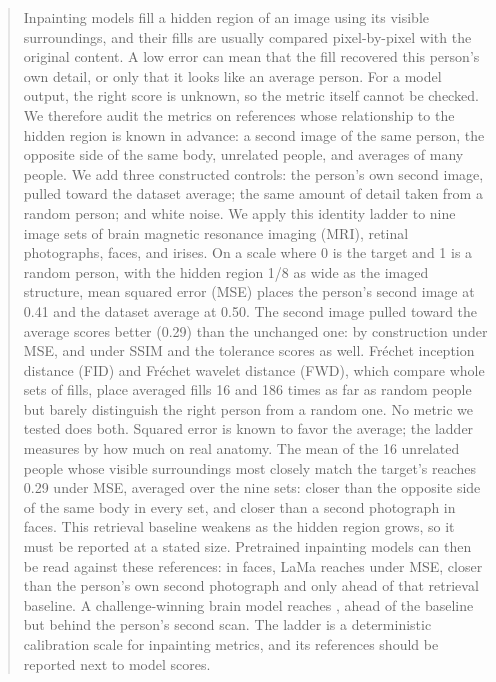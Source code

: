 \begin{abstract}
Inpainting models fill a hidden region of an image using its visible surroundings, and their fills are usually compared pixel-by-pixel with the original content.
A low error can mean that the fill recovered this person's own detail, or only that it looks like an average person.
For a model output, the right score is unknown, so the metric itself cannot be checked.
We therefore audit the metrics on references whose relationship to the hidden region is known in advance: a second image of the same person, the opposite side of the same body, unrelated people, and averages of many people.
We add three constructed controls: the person's own second image, pulled toward the dataset average; the same amount of detail taken from a random person; and white noise.
We apply this identity ladder to nine image sets of brain magnetic resonance imaging (MRI), retinal photographs, faces, and irises.
On a scale where 0 is the target and 1 is a random person, with the hidden region 1/8 as wide as the imaged structure, mean squared error (MSE) places the person's second image at 0.41 and the dataset average at 0.50.
The second image pulled toward the average scores better (0.29) than the unchanged one: by construction under MSE, and under SSIM and the tolerance scores as well.
Fr\'echet inception distance (FID) and Fr\'echet wavelet distance (FWD), which compare whole sets of fills, place averaged fills 16 and 186 times as far as random people but barely distinguish the right person from a random one.
No metric we tested does both.
Squared error is known to favor the average; the ladder measures by how much on real anatomy.
The mean of the 16 unrelated people whose visible surroundings most closely match the target's reaches 0.29 under MSE, averaged over the nine sets: closer than the opposite side of the same body in every set, and closer than a second photograph in faces.
This retrieval baseline weakens as the hidden region grows, so it must be reported at a stated size.
Pretrained inpainting models can then be read against these references: in faces, LaMa reaches \mfLamaHqImdbMse{} under MSE, closer than the person's own second photograph and only \mfLamaHqImdbAheadNearest{} ahead of that retrieval baseline.
A challenge-winning brain model reaches \mfBratsQtimMse{}, ahead of the baseline but behind the person's second scan.
The ladder is a deterministic calibration scale for inpainting metrics, and its references should be reported next to model scores.
\end{abstract}
